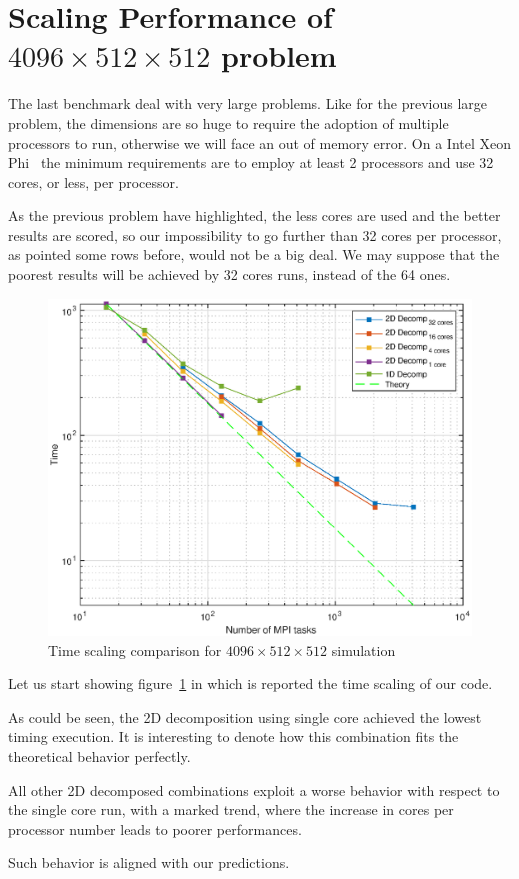 \section{Scaling Performance of $4096\times512\times512$ problem}
The last benchmark deal with very large problems. Like for the previous large problem, the dimensions are so huge to require the adoption of multiple processors to run, otherwise we will face an out of memory error.
On a Intel Xeon Phi~\cite{intel:xeonphi} the minimum requirements are to employ at least 2 processors and use 32 cores, or less, per processor.
\par
As the previous problem have highlighted, the less cores are used and the better results are scored, so our impossibility to go further than 32 cores per processor, as pointed some rows before, would not be a big deal. We may suppose that the poorest results will be achieved by 32 cores runs, instead of the 64 ones. \\
\par

\begin{figure}
\begin{center}
\includegraphics[scale=0.55]{grafici/20481}
\caption{Time scaling comparison for $4096\times 512\times 512$ simulation}
\label{20481}
\end{center} 
\end{figure}

Let us start showing figure~\ref{20481} in which is reported the time scaling of our code.\par
As could be seen, the 2D decomposition using single core achieved the lowest timing execution.
It is interesting to denote how this combination fits the theoretical behavior perfectly.\par
All other 2D decomposed combinations exploit a worse behavior with respect to the single core run, with a marked trend, where the increase in cores per processor number leads to poorer performances. \par 
Such behavior is aligned with our predictions.\\

